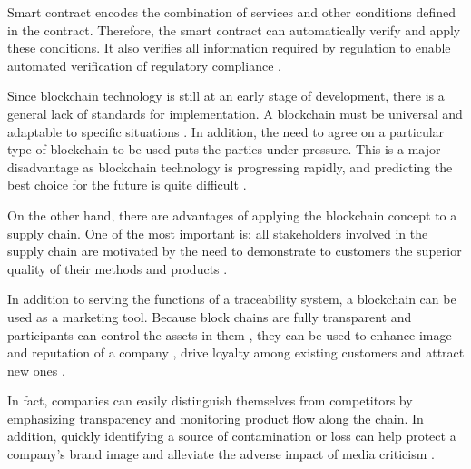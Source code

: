 Smart contract encodes the combination of services and other conditions defined in the contract. Therefore, the smart contract can automatically verify and apply these conditions. It also verifies all information required by regulation to enable automated verification of regulatory compliance \cite{lu2017adaptable}. 

Since blockchain technology is still at an early stage of development, there is a general lack of standards for implementation. A blockchain must be universal and adaptable to specific situations \cite{valenta2017comparison}. In addition, the need to agree on a particular type of blockchain to be used puts the parties under pressure. This is a major disadvantage as blockchain technology is progressing rapidly, and predicting the best choice for the future is quite difficult \cite{galvez2018future}.

On the other hand, there are advantages of applying the blockchain concept to a supply chain. One of the most important is: all stakeholders involved in the supply chain are motivated by the need to demonstrate to customers the superior quality of their methods and products \cite{lu2017adaptable}. 

In addition to serving the functions of a traceability system, a blockchain can be used as a marketing tool. Because block chains are fully transparent\cite{iansiti2017truth} and participants can control the assets in them \cite{liao2011food}, they can be used to enhance image and reputation of a company \cite{van2007essentials}, drive loyalty among existing customers \cite{pizzuti2015global} and attract new ones \cite{svensson2009transparency}. 

In fact, companies can easily distinguish themselves from competitors by emphasizing transparency and monitoring product flow along the chain. In addition, quickly identifying a source of contamination or loss can help protect a company's brand image \cite{mejia2010traceability} and alleviate the adverse impact of media criticism \cite{dabbene2011food}.
